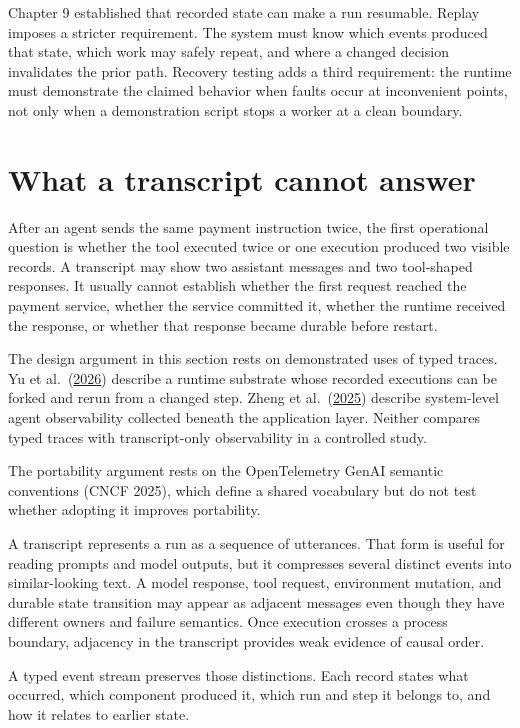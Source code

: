 Chapter 9 established that recorded state can make a run resumable. Replay imposes a stricter requirement. The system must know which events produced that state, which work may safely repeat, and where a changed decision invalidates the prior path. Recovery testing adds a third requirement: the runtime must demonstrate the claimed behavior when faults occur at inconvenient points, not only when a demonstration script stops a worker at a clean boundary.

\hypertarget{what-a-transcript-cannot-answer}{%
\section{What a transcript cannot answer}\label{what-a-transcript-cannot-answer}}

After an agent sends the same payment instruction twice, the first operational question is whether the tool executed twice or one execution produced two visible records. A transcript may show two assistant messages and two tool-shaped responses. It usually cannot establish whether the first request reached the payment service, whether the service committed it, whether the runtime received the response, or whether that response became durable before restart.

The design argument in this section rests on demonstrated uses of typed traces. Yu et al.~(\href{https://arxiv.org/abs/2605.10913}{2026}) describe a runtime substrate whose recorded executions can be forked and rerun from a changed step. Zheng et al.~(\href{https://arxiv.org/abs/2508.02736}{2025}) describe system-level agent observability collected beneath the application layer. Neither compares typed traces with transcript-only observability in a controlled study.

The portability argument rests on the OpenTelemetry GenAI semantic conventions (CNCF 2025), which define a shared vocabulary but do not test whether adopting it improves portability.

A transcript represents a run as a sequence of utterances. That form is useful for reading prompts and model outputs, but it compresses several distinct events into similar-looking text. A model response, tool request, environment mutation, and durable state transition may appear as adjacent messages even though they have different owners and failure semantics. Once execution crosses a process boundary, adjacency in the transcript provides weak evidence of causal order.

A typed event stream preserves those distinctions. Each record states what occurred, which component produced it, which run and step it belongs to, and how it relates to earlier state.

